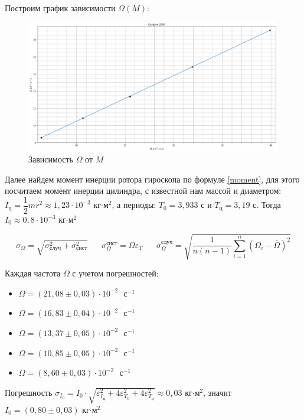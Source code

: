 \documentclass[a4paper,12pt]{article}
\begin{document}
	Построим график зависимости $\Omega(M)$:
	\begin{figure}[h!]
		\includegraphics[scale=0.53]{1.2.5 graph}
		\caption{Зависимость $ \Omega $ от $ M $}
		\label{graph}
	\end{figure}

	Далее найдем момент инерции ротора гироскопа по формуле \eqref{moment}, для этого посчитаем момент инерции цилиндра, с известной нам массой и диаметром: $I_\text{ц} = \dfrac{1}{2}mr^2 \approx 1,23\cdot 10^{-3}$ кг$\cdot \text{м}^2$, а периоды: $T_0 = 3,933$ с и $T_\text{ц} = 3,19$ с. Тогда $I_0 \approx 0,8\cdot 10^{-3}$ кг$\cdot \text{м}^2$

	\begin{equation}
		\sigma_\Omega = \sqrt{ \sigma_\text{случ}^2 + \sigma_\text{сист}^2} \;\;\;\;\;\; \sigma_\Omega^\text{сист} = \Omega \varepsilon_T \;\;\;\;\;\; \sigma_\Omega^\text{случ}=  \sqrt{\frac{1}{n(n-1)} \sum_{i=1}^{n}(\Omega_i - \overline{\Omega})^2}
	\end{equation}

	Каждая частота $\Omega$ с учетом погрешностей:
	\begin{itemize}
		\item $\Omega = (21,08 \pm 0,03)\cdot10^{-2}\text{ }\text{с}^{-1}$
		\item $\Omega = (16,83 \pm 0,04)\cdot10^{-2}\text{ }\text{с}^{-1}$
		\item $\Omega = (13,37 \pm 0,05)\cdot10^{-2}\text{ }\text{с}^{-1}$
		\item $\Omega = (10,85 \pm 0,05)\cdot10^{-2}\text{ }\text{с}^{-1}$
		\item $\Omega = (8,60 \pm 0,03)\cdot10^{-2}\text{ }\text{с}^{-1}$
	\end{itemize}

	Погрешность $\sigma_{I_0} = I_0\cdot\sqrt{\varepsilon_{I_\text{ц}}^2+ 4\varepsilon_{T_0}^2+ 4\varepsilon_{T_\text{ц}}^2 } \approx 0,03$ кг$\cdot \text{м}^2$, значит $I_0 = (0,80\pm 0,03)$ кг$\cdot \text{м}^2$
\end{document}
